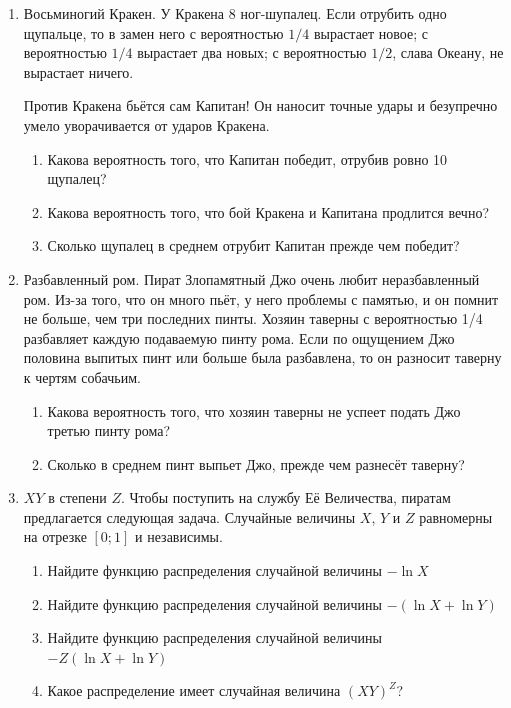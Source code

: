 \begin{enumerate}
\item Восьминогий Кракен. У Кракена 8 ног-шупалец. Если отрубить одно щупальце, то в замен него с вероятностью $1/4$ вырастает новое; с вероятностью $1/4$ вырастает два новых; с вероятностью $1/2$, слава Океану, не вырастает ничего.

Против Кракена бьётся сам Капитан! Он наносит точные удары и безупречно умело уворачивается от ударов Кракена.

\begin{enumerate}
\item Какова вероятность того, что Капитан победит, отрубив ровно 10 щупалец?
\item Какова вероятность того, что бой Кракена и Капитана продлится вечно?
\item Сколько щупалец в среднем отрубит Капитан прежде чем победит?
\end{enumerate}

\item Разбавленный ром. Пират Злопамятный Джо очень любит неразбавленный ром. Из-за
того, что он много пьёт, у него проблемы с памятью, и он помнит не
больше, чем три последних пинты. Хозяин таверны с вероятностью 1/4 разбавляет
каждую подаваемую пинту рома. Если по ощущением Джо половина выпитых
пинт или больше была разбавлена, то он разносит таверну к чертям
собачьим.


\begin{enumerate}
\item Какова вероятность того, что хозяин таверны не успеет подать Джо третью пинту рома?
\item Сколько в среднем пинт выпьет Джо, прежде чем разнесёт таверну?
\end{enumerate}

\item $XY$ в степени $Z$. Чтобы поступить на службу Её Величества, пиратам предлагается следующая задача. Случайные величины $X$, $Y$ и $Z$ равномерны на отрезке $[0;1]$ и независимы.

\begin{enumerate}
\item Найдите функцию распределения случайной величины $-\ln X$
\item Найдите функцию распределения случайной величины $-(\ln X + \ln Y)$
\item Найдите функцию распределения случайной величины $-Z(\ln X + \ln Y)$
\item Какое распределение имеет случайная величина $(XY)^Z$?
\end{enumerate}


\end{enumerate}
